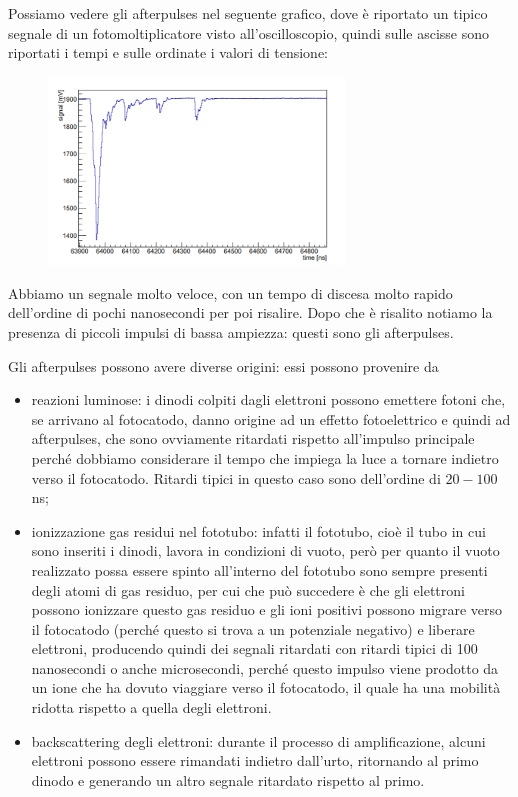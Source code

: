 Possiamo vedere gli afterpulses nel seguente grafico, dove è riportato un tipico segnale di un fotomoltiplicatore visto all'oscilloscopio, quindi sulle ascisse sono riportati i tempi e sulle ordinate i valori di tensione:
\begin{figure}[H]
   \centering
   \includegraphics[width=0.7\textwidth]{immagini/afterpulses.png}
\end{figure}
Abbiamo un segnale molto veloce, con un tempo di discesa molto rapido dell'ordine di pochi nanosecondi per poi risalire. Dopo che è risalito notiamo la presenza di piccoli impulsi di bassa ampiezza: questi sono gli afterpulses.

Gli afterpulses possono avere diverse origini: essi possono provenire da
\begin{itemize}[leftmargin=0.5cm]
   \item reazioni luminose: i dinodi colpiti dagli elettroni possono emettere fotoni che, se arrivano al fotocatodo, danno origine ad un effetto fotoelettrico e quindi ad afterpulses, che sono ovviamente ritardati rispetto all'impulso principale perché dobbiamo considerare il tempo che impiega la luce a tornare indietro verso il fotocatodo. Ritardi tipici in questo caso sono dell'ordine di $20-100$ ns;
   \item ionizzazione gas residui nel fototubo: infatti il fototubo, cioè il tubo in cui sono inseriti i dinodi, lavora in condizioni di vuoto, però per quanto il vuoto realizzato possa essere spinto all'interno del fototubo sono sempre presenti degli atomi di gas residuo, per cui che può succedere è che gli elettroni possono ionizzare questo gas residuo e gli ioni positivi possono migrare verso il fotocatodo (perché questo si trova a un potenziale negativo) e liberare elettroni, producendo quindi dei segnali ritardati con ritardi tipici di 100 nanosecondi o anche microsecondi, perché questo impulso viene prodotto da un ione che ha dovuto viaggiare verso il fotocatodo, il quale ha una mobilità ridotta rispetto a quella degli elettroni.
   \item backscattering degli elettroni: durante il processo di amplificazione, alcuni elettroni possono essere rimandati indietro dall'urto, ritornando al primo dinodo e generando un altro segnale ritardato rispetto al primo.
\end{itemize}

